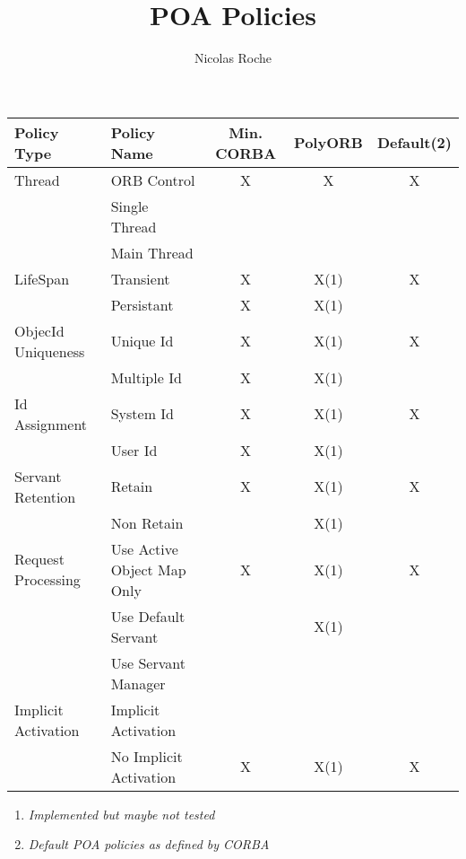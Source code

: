 \documentclass[a4paper,10pt]{article}
\title{POA Policies}
\author{Nicolas Roche}
\begin{document}
\maketitle
\begin{center}
\begin {tabular}{|l|l|c|c|c|}
\hline
\textbf{Policy Type}&\textbf{Policy Name}&
\textbf{Min. CORBA}&\textbf{PolyORB}&\textbf{Default}(2)\\
\hline
\hline
Thread             &ORB Control               &X&X&X\\
                   &Single Thread             & & & \\
	           &Main Thread               & & & \\
\hline
LifeSpan           &Transient                 &X&X(1)&X\\
		   &Persistant                &X&X(1)& \\
\hline
ObjecId Uniqueness &Unique Id                 &X&X(1)&X\\
	           &Multiple Id               &X&X(1)& \\
\hline
Id Assignment      &System Id                 &X&X(1)&X\\
	           &User Id                   &X&X(1)& \\
\hline
Servant Retention  &Retain                    &X&X(1)&X\\
	           &Non Retain                & &X(1)& \\
\hline
Request Processing &Use Active Object Map Only&X&X(1)&X\\
	           &Use Default Servant       & &X(1)& \\
	           &Use Servant Manager       & & & \\
\hline
Implicit Activation&Implicit Activation       & & & \\
	           &No Implicit Activation    &X&X(1)&X\\
\hline
\end{tabular}
\begin{enumerate}
\item \textit{Implemented but maybe not tested}
\item \textit{Default POA policies as defined by CORBA}
\end{enumerate}
\end{center}
\end{document}
